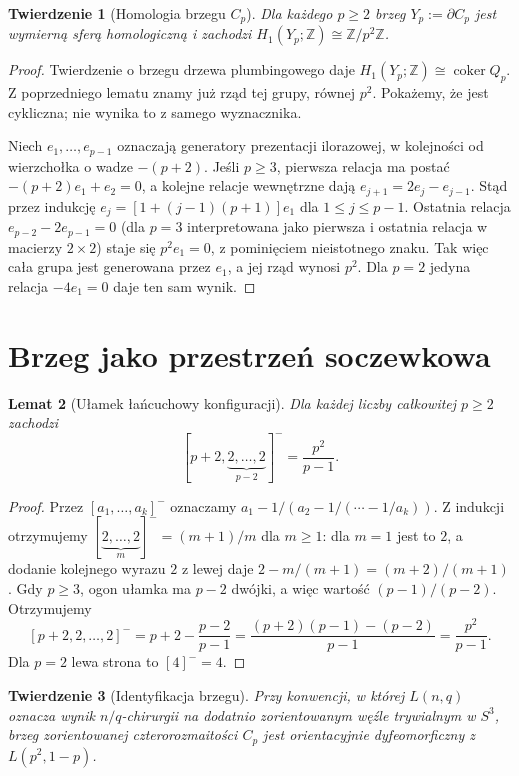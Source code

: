 \documentclass[11pt,a4paper]{report}
\numberwithin{equation}{section}
\theoremstyle{plain}
\newtheorem{twierdzenie}{Twierdzenie}[section]
\newtheorem{lemat}[twierdzenie]{Lemat}
\theoremstyle{definition}
\theoremstyle{remark}
\begin{document}
\begin{twierdzenie}[Homologia brzegu $C_p$]
\label{thm:tg-rb-h1boundary}
Dla każdego $p\geq2$ brzeg $Y_p:=\partial C_p$
jest wymierną sferą homologiczną i zachodzi
$H_1(Y_p;\mathbb Z)\cong\mathbb Z/p^2\mathbb Z$.
\end{twierdzenie}

\begin{proof}
Twierdzenie o brzegu drzewa plumbingowego daje
$H_1(Y_p;\mathbb Z)\cong\operatorname{coker}Q_p$.
Z poprzedniego lematu znamy już rząd tej grupy,
równej $p^2$. Pokażemy, że jest cykliczna;
nie wynika to z samego wyznacznika.

Niech $e_1,\ldots,e_{p-1}$ oznaczają generatory
prezentacji ilorazowej, w kolejności od wierzchołka
o wadze $-(p+2)$. Jeśli $p\geq3$, pierwsza relacja
ma postać $-(p+2)e_1+e_2=0$, a kolejne relacje
wewnętrzne dają $e_{j+1}=2e_j-e_{j-1}$.
Stąd przez indukcję
$e_j=[1+(j-1)(p+1)]e_1$ dla $1\leq j\leq p-1$.
Ostatnia relacja $e_{p-2}-2e_{p-1}=0$
(dla $p=3$ interpretowana jako pierwsza i ostatnia
relacja w macierzy $2\times2$) staje się
$p^2e_1=0$, z pominięciem nieistotnego znaku.
Tak więc cała grupa jest generowana przez $e_1$,
a jej rząd wynosi $p^2$. Dla $p=2$ jedyna relacja
$-4e_1=0$ daje ten sam wynik.
\end{proof}

\section{Brzeg jako przestrzeń soczewkowa}
\label{sec:tg-rb-lens}

\begin{lemat}[Ułamek łańcuchowy konfiguracji]
\label{lem:tg-rb-cfrac}
Dla każdej liczby całkowitej $p\geq2$ zachodzi
\[
[p+2,\underbrace{2,\ldots,2}_{p-2}]^-
=\frac{p^2}{p-1}.
\]
\end{lemat}

\begin{proof}
Przez $[a_1,\ldots,a_k]^-$ oznaczamy
$a_1-1/(a_2-1/(\cdots-1/a_k))$.
Z indukcji otrzymujemy $[\underbrace{2,\ldots,2}_{m}]^-
=(m+1)/m$ dla $m\geq1$: dla $m=1$ jest to $2$,
a dodanie kolejnego wyrazu $2$ z lewej daje
$2-m/(m+1)=(m+2)/(m+1)$.
Gdy $p\geq3$, ogon ułamka ma $p-2$ dwójki,
a więc wartość $(p-1)/(p-2)$. Otrzymujemy
\[
[p+2,2,\ldots,2]^-
=p+2-\frac{p-2}{p-1}
=\frac{(p+2)(p-1)-(p-2)}{p-1}
=\frac{p^2}{p-1}.
\]
Dla $p=2$ lewa strona to $[4]^-=4$.
\end{proof}

\begin{twierdzenie}[Identyfikacja brzegu]
\label{thm:tg-rb-lens}
Przy konwencji, w której $L(n,q)$ oznacza wynik
$n/q$-chirurgii na dodatnio zorientowanym węźle
trywialnym w $S^3$, brzeg zorientowanej
czterorozmaitości $C_p$ jest orientacyjnie
dyfeomorficzny z $L(p^2,1-p)$.
\end{twierdzenie}
\end{document}
